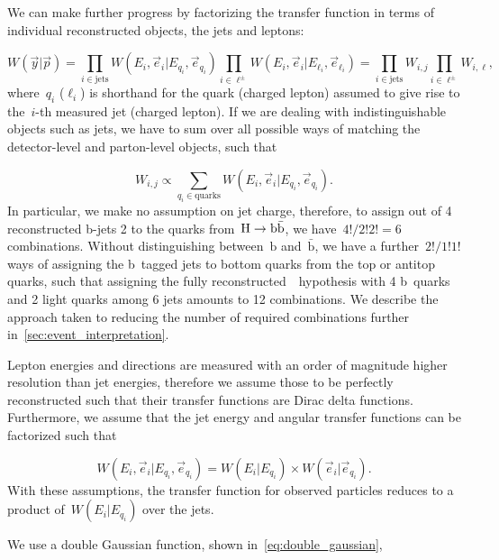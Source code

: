 We can make further progress by factorizing the transfer function in terms of individual reconstructed objects, the jets and leptons:

\begin{equation}
W(\vec{y} | \vec{p}) = \prod_{i\in \mathrm{jets}} W(E_i, \vec{e}_i | E_{q_i}, \vec{e}_{q_i})
\prod_{i\in \ell^\pm} W(E_i, \vec{e}_i | E_{\ell_i}, \vec{e}_{\ell_i}) = \prod_{i \in \mathrm{jets}} W_{i,j} \prod_{i \in \ell^\pm} W_{i,\ell},
\end{equation}
where~$q_i$ ($\ell_i$) is shorthand for the quark (charged lepton) assumed to give rise to the~$i$-th measured jet (charged lepton). If we are dealing with indistinguishable objects such as jets, we have to sum over all possible ways of matching the detector-level and parton-level objects, such that

\begin{equation}
\label{eq:tf_combination_sum}
W_{i,j} \propto \sum_{q_i \in \mathrm{quarks}} W(E_i, \vec{e}_i | E_{q_i}, \vec{e}_{q_i}).
\end{equation}
In particular, we make no assumption on jet charge, therefore, to assign out of 4 reconstructed b-jets 2 to the quarks from~$\mathrm{H} \rightarrow \mathrm{b}\bar{\mathrm{b}}$, we have~$4!/2!2! = 6$ combinations. Without distinguishing between~$\mathrm{b}$ and~$\bar{\mathrm{b}}$, we have a further~$2!/1!1!$ ways of assigning the b~tagged jets to bottom quarks from the top or antitop quarks, such that assigning the fully reconstructed~\ttHbb~hypothesis with 4 b~quarks and 2 light quarks among 6 jets amounts to 12 combinations. We describe the approach taken to reducing the number of required combinations further in~\cref{sec:event_interpretation}.

Lepton energies and directions are measured with an order of magnitude higher resolution than jet energies, therefore we assume those to be perfectly reconstructed such that their transfer functions are Dirac delta functions.
Furthermore, we assume that the jet energy and angular transfer functions can be factorized such that

\begin{equation}
W(E_i, \vec{e}_i | E_{q_i}, \vec{e}_{q_i}) = W(E_i | E_{q_i}) \times W(\vec{e}_i | \vec{e}_{q_i}).
\end{equation}
With these assumptions, the transfer function for observed particles reduces to a product of~$W(E_i | E_{q_i})$ over the jets.

We use a double Gaussian function, shown in~\cref{eq:double_gaussian},

